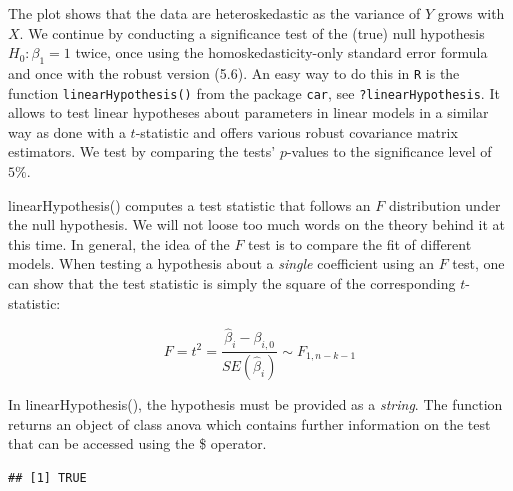 \documentclass[]{book}
\newenvironment{Shaded}{\begin{snugshade}}{\end{snugshade}}
\newcommand{\KeywordTok}[1]{\textcolor[rgb]{0.13,0.29,0.53}{\textbf{#1}}}
\newcommand{\DataTypeTok}[1]{\textcolor[rgb]{0.13,0.29,0.53}{#1}}
\newcommand{\DecValTok}[1]{\textcolor[rgb]{0.00,0.00,0.81}{#1}}
\newcommand{\FloatTok}[1]{\textcolor[rgb]{0.00,0.00,0.81}{#1}}
\newcommand{\StringTok}[1]{\textcolor[rgb]{0.31,0.60,0.02}{#1}}
\newcommand{\CommentTok}[1]{\textcolor[rgb]{0.56,0.35,0.01}{\textit{#1}}}
\newcommand{\OperatorTok}[1]{\textcolor[rgb]{0.81,0.36,0.00}{\textbf{#1}}}
\newcommand{\NormalTok}[1]{#1}
\theoremstyle{definition}
\theoremstyle{definition}
\theoremstyle{definition}
\theoremstyle{remark}
\let\BeginKnitrBlock\begin \let\EndKnitrBlock\end
\begin{document}
The plot shows that the data are heteroskedastic as the variance of
\(Y\) grows with \(X\). We continue by conducting a significance test of
the (true) null hypothesis \(H_0: \beta_1 = 1\) twice, once using the
homoskedasticity-only standard error formula and once with the robust
version (5.6). An easy way to do this in \texttt{R} is the function
\texttt{linearHypothesis()} from the package \texttt{car}, see
\texttt{?linearHypothesis}. It allows to test linear hypotheses about
parameters in linear models in a similar way as done with a
\(t\)-statistic and offers various robust covariance matrix estimators.
We test by comparing the tests' \(p\)-values to the significance level
of \(5\%\).

\BeginKnitrBlock{rmdknit}
linearHypothesis() computes a test statistic that follows an \(F\)
distribution under the null hypothesis. We will not loose too much words
on the theory behind it at this time. In general, the idea of the \(F\)
test is to compare the fit of different models. When testing a
hypothesis about a \emph{single} coefficient using an \(F\) test, one
can show that the test statistic is simply the square of the
corresponding \(t\)-statistic:

\[ F = t^2 = \frac{\hat\beta_i - \beta_{i,0}}{SE(\hat\beta_i)} \sim F_{1,n-k-1}  \]

In linearHypothesis(), the hypothesis must be provided as a
\emph{string}. The function returns an object of class anova which
contains further information on the test that can be accessed using the
\$ operator.
\EndKnitrBlock{rmdknit}

\begin{Shaded}
\end{Shaded}

\begin{verbatim}
## [1] TRUE
\end{verbatim}

\begin{Shaded}
\end{Shaded}
\end{document}
